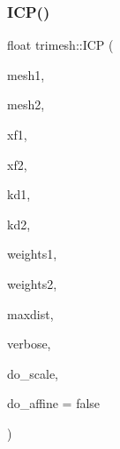 \mbox{\label{namespacetrimesh_a71ee28e5aabcb5da6055c743e00d920b}} 
\subsubsection{\texorpdfstring{I\+C\+P()}{ICP()}\hspace{0.1cm}{\footnotesize\ttfamily [4/7]}}
{\footnotesize\ttfamily float trimesh\+::\+I\+CP (\begin{DoxyParamCaption}\item[{\hyperlink{classtrimesh_1_1TriMesh}{Tri\+Mesh} $\ast$}]{mesh1,  }\item[{\hyperlink{classtrimesh_1_1TriMesh}{Tri\+Mesh} $\ast$}]{mesh2,  }\item[{const \hyperlink{namespacetrimesh_ad504958f2f56e393991b848986a8459f}{xform} \&}]{xf1,  }\item[{\hyperlink{namespacetrimesh_ad504958f2f56e393991b848986a8459f}{xform} \&}]{xf2,  }\item[{const \hyperlink{classtrimesh_1_1KDtree}{K\+Dtree} $\ast$}]{kd1,  }\item[{const \hyperlink{classtrimesh_1_1KDtree}{K\+Dtree} $\ast$}]{kd2,  }\item[{\+::std\+::vector$<$ float $>$ \&}]{weights1,  }\item[{\+::std\+::vector$<$ float $>$ \&}]{weights2,  }\item[{float}]{maxdist,  }\item[{int}]{verbose,  }\item[{bool}]{do\+\_\+scale,  }\item[{bool}]{do\+\_\+affine = {\ttfamily false} }\end{DoxyParamCaption})}

\mbox{\label{namespacetrimesh_a00bf593d97e195670637651eca9c9bd4}} 
